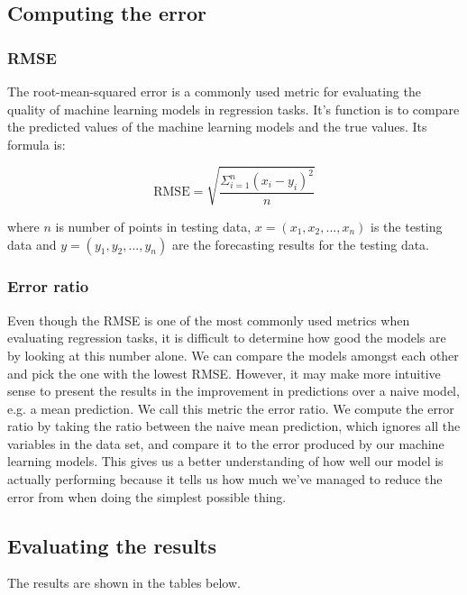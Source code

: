 \documentclass[12pt]{article}
\begin{document}
	\subsection{Computing the error}
	
	\subsubsection{RMSE}
		The root-mean-squared error is a commonly used metric for evaluating the quality of machine learning models in regression tasks. It's function is to compare the predicted values of the machine learning models and the true values. Its formula is: 
		
		$$\text{RMSE} = \sqrt{\frac{\Sigma_{i=1}^{n} (x_i-y_i)^2}{n}}$$
		
		where $n$ is number of points in testing data, $x=(x_1, x_2, ..., x_n)$ is the testing data and $y=(y_1, y_2, ..., y_n)$ are the forecasting results for the testing data.
		
	\subsubsection{Error ratio}
	
	Even though the RMSE is one of the most commonly used metrics when evaluating regression tasks, it is difficult to determine how good the models are by looking at this number alone. We can compare the models amongst each other and pick the one with the lowest RMSE. However, it may make more intuitive sense to present the results in the improvement in predictions over a naive model, e.g. a mean prediction. We call this metric the error ratio. We compute the error ratio by taking the ratio between the naive mean prediction, which ignores all the variables in the data set, and compare it to the error produced by our machine learning models. This gives us a better understanding of how well our model is actually performing because it tells us how much we've managed to reduce the error from when doing the simplest possible thing.
	
	\subsection{Evaluating the results}
	The results are shown in the tables below. 
	
\end{document}
